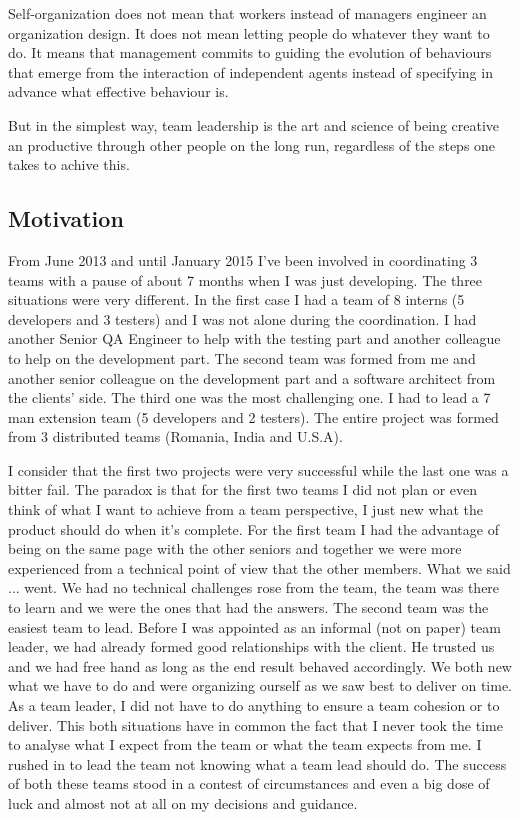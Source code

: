 \begin{displayquote}
Self-organization does not mean that workers instead of managers engineer an organization design. It does not mean letting people do whatever they want to do. It means that management commits to guiding the evolution of behaviours that emerge from the interaction of independent agents instead of specifying in advance what effective behaviour is.
\end{displayquote}

But in the simplest way, team leadership is the art and science of being creative an productive through other people on the long run, regardless of the steps one takes to achive this.


\subsection{Motivation}
\label{sub-sec:motivation}

From June 2013 and until January 2015 I've been involved in coordinating 3 teams with a pause of about 7 months when I was just developing. The three situations were very different. In the first case I had a team of 8 interns (5 developers and 3 testers) and I was not alone during the coordination. I had another Senior QA Engineer to help with the testing part and another colleague to help on the development part. The second team was formed from me and another senior colleague on the development part and a software architect from the clients' side. The third one was the most challenging one. I had to lead a 7 man extension team (5 developers and 2 testers). The entire project was formed from 3 distributed teams (Romania, India and U.S.A). 

I consider that the first two projects were very successful while the last one was a bitter fail. The paradox is that for the first two teams I did not plan or even think of what I want to achieve from a team perspective, I just new what the product should do when it's complete. For the first team I had the advantage of being on the same page with the other seniors and together we were more experienced from a technical point of view that the other members. What we said ... went. We had no technical challenges rose from the team, the team was there to learn and we were the ones that had the answers. The second team was the easiest team to lead. Before I was appointed as an informal (not on paper) team leader, we had already formed good relationships with the client. He trusted us and we had free hand as long as the end result behaved accordingly. We both new what we have to do and were organizing ourself as we saw best to deliver on time. As a team leader, I did not have to do anything to ensure a team cohesion or to deliver. This both situations have in common the fact that I never took the time to analyse what I expect from the team or what the team  expects from me. I rushed in to lead the team not knowing what a team lead should do. The success of both these teams stood in a contest of circumstances and even a big dose of luck and almost not at all on my decisions and guidance.

